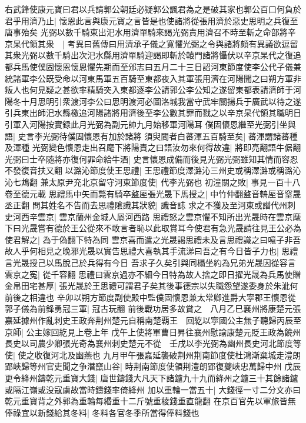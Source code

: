 右武鋒使康元寶曰君以兵請郭公朝廷必疑郭公諷君為之是破其家也郭公百口何負於君乎用濟乃止|{
	懷恩此言與康元寶之言皆是也使諸將從張用濟於惡史思明之兵復至唐事殆矣}
光弼以數千騎東出汜水用濟單騎來謁光弼責用濟召不時至斬之命部將辛京杲代領其衆　|{
	考異曰舊傳曰用濟承子儀之寛懼光弼之令與諸將頗有異議欲逗留其衆光弼以數千騎出次汜水縣用濟單騎迎謁即斬於轅門諸將懾伏以辛京杲代之復追都兵馬使僕固懷恩懷恩懼先期而至邠志曰五月二十三日詔河東節度使李公代子儀兼統諸軍李公既受命以河東馬軍五百騎至東都夜入其軍張用濟在河陽聞之曰朔方軍非叛人也何見疑之甚欲率精騎突入東都逐李公請郭公李公知之遂留東都表請濟師于河陽冬十月思明引衆渡河李公曰思明渡河必圖洛城我當守武牢關揚兵于廣武以待之遂引兵東出師汜水縣檄追河陽諸將用濟後至李公數其罪而戮之以辛京杲代領其職明日引軍入河陽按實録此月光弼為副元帥九月始移軍河陽耳}
僕固懷恩繼至光弼引坐與語|{
	史言李光弼待僕固懷恩有加於諸將}
須臾閽者白蕃渾五百騎至矣|{
	蕃渾謂諸蕃種及渾種}
光弼變色懷恩走出召麾下將陽責之曰語汝勿來何得故違|{
	將即亮翻語牛倨翻}
光弼曰士卒随將亦復何罪命給牛酒|{
	史言懷恩成備而後見光弼光弼雖知其情而容忍不發復音扶又翻}
以潞沁節度使王思禮|{
	王思禮節度澤潞沁三州史或稱澤潞或稱潞沁沁七鴆翻}
兼太原尹充北京留守河東節度使|{
	代李光弼也}
初潼關之敗|{
	事見一百十八卷至德元載}
思禮馬中矢而斃有騎卒盩厔張光晟下馬授之|{
	中竹仲翻盩音輈厔音窒晟丞正翻}
問其姓名不告而去思禮隂識其狀貌|{
	識音誌}
求之不獲及至河東或譖代州刺史河西辛雲京|{
	雲京蘭州金城人屬河西路}
思禮怒之雲京懼不知所出光晟時在雲京麾下曰光晟嘗有德於王公從來不敢言者恥以此取賞耳今使君有急光晟請往見王公必為使君解之|{
	為于偽翻下特為同}
雲京喜而遣之光晟謁思禮未及言思禮識之曰噫子非吾故人乎何相見之晚邪光晟以實告思禮大喜執其手流涕曰吾之有今日皆子力也|{
	思禮言光晟授己以馬脫己於兵得有今日}
吾求子久矣引與同榻坐約為兄弟光晟因從容言雲京之寃|{
	從千容翻}
思禮曰雲京過亦不細今日特為故人捨之即日擢光晟為兵馬使贈金帛田宅甚厚|{
	張光晟於王思禮可謂君子矣其後事德宗以失職怨望遂委身於朱泚何前後之相違也}
辛卯以朔方節度副使殿中監僕固懷恩兼太常卿進爵大寜郡王懷恩從郭子儀為前鋒勇冠三軍|{
	冠古玩翻}
前後戰功居多故賞之　八月乙巳襄州將康楚元張嘉延據州作亂刺史王政奔荆州楚元自稱南楚覇王　回紇以寜國公主無子聽歸丙辰至京師|{
	公主嫁回紇見上卷上年}
戊午上使將軍曹日昇往襄州慰諭康楚元貶王政為饒州長史以司農少卿張光奇為襄州刺史楚元不從　壬戌以李光弼為幽州長史河北節度等使|{
	使之收復河北及幽燕也}
九月甲午張嘉延襲破荆州荆南節度使杜鴻漸棄城走澧朗郢峽歸等州官吏聞之争潛竄山谷|{
	時荆南節度使領荆澧朗郢復夔峽忠萬歸中州}
戊辰更令絳州鑄乾元重寶大錢|{
	唐世鑄錢大凡天下諸鑪九十九而絳州之鑪三十其餘諸鑪或隔江嶺或没寇虜故當時鑄錢率倚絳州}
加以重輪一當五十|{
	大錢徑一寸二分文亦曰乾元重寶背之外郭為重輪每緡重十二斤號重稜錢重直龍翻}
在京百官先以軍旅皆無俸祿宜以新錢給其冬料|{
	冬料各官冬季所當得俸料錢也}
